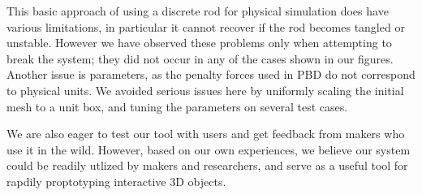 This basic approach of using a discrete rod for physical simulation does have various limitations, in particular it
cannot recover if the rod becomes tangled or unstable. 
However we have observed these problems only when attempting to break
the system; they did not occur in any of the cases shown in our figures.
Another issue is parameters, as the penalty forces used in PBD do not
correspond to physical units. We avoided serious issues here by uniformly
scaling the initial mesh to a unit box, and tuning the parameters on several test cases.

We are also eager to test our tool with users and get feedback from makers who use it in the wild. However, based on our own experiences, we believe our system could be readily utlized by makers and researchers, and serve as a useful tool for rapdily proptotyping interactive 3D objects.
